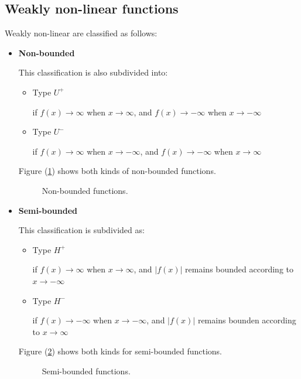 \documentclass[conference,letterpaper,onecolumn,11pt]{IEEEtran}
\begin{document}
\subsection{Weakly non-linear functions}
Weakly non-linear are classified as follows:

\begin{itemize}
\item {\bf Non-bounded}\hfill\par
	This classification is also subdivided into:
      \begin{itemize}
      \item Type $U^+$\hfill \par
	if $f(x)\to \infty$ when $x\to \infty$,
            and $f(x)\to -\infty$ when $x\to -\infty$
      \item Type $U^-$\hfill \par
	if $f(x)\to \infty$ when $x\to -\infty$,
            and $f(x)\to -\infty$ when $x\to \infty$      
      \end{itemize}
 
      Figure (\ref{UB}) shows both kinds of non-bounded functions.
      \begin{figure}[!h]
       \centerline{
       \epsfxsize=80mm
       }
       \caption{Non-bounded functions.}
       \label{UB}
      \end{figure}
      
\item {\bf Semi-bounded}\hfill\par
	 This classification is subdivided as:
      \begin{itemize}
      \item Type $H^+$ \hfill \par
        if $f(x)\to \infty$ when $x\to \infty$,
        and $|f(x)|$ remains bounded  according to $x\to -\infty$
      \item Type $H^-$\hfill\par
            if $f(x)\to -\infty$ when $x\to -\infty$,
            and $|f(x)|$ remains bounden according to $x\to \infty$
      \end{itemize} 
      
   Figure (\ref{HB}) shows both kinds for semi-bounded functions.
      \begin{figure}[!h]
       \centerline{
       \epsfxsize=80mm
       }
       \caption{Semi-bounded functions.}
       \label{HB}
      \end{figure}



\end{itemize}
\end{document}
